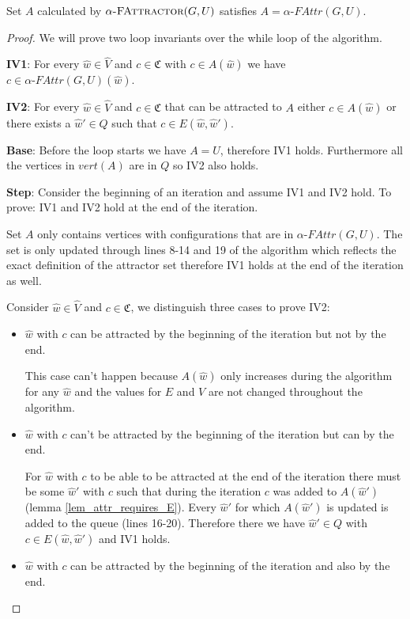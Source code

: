 \begin{theorem}
Set $A$ calculated by $\textsc{$\alpha$-FAttractor}(G,U)$ satisfies $A = \alpha\textit{-FAttr}(G,U)$.
	\begin{proof} We will prove two loop invariants over the while loop of the algorithm.
		
		\textbf{IV1}: For every $\hat{w} \in \hat{V}$ and $c \in \mathfrak{C}$ with $c \in A(\hat{w})$ we have $c \in \alpha\textit{-FAttr}(G,U)(\hat{w})$.
		
		\textbf{IV2}: For every $\hat{w} \in \hat{V}$ and $c \in \mathfrak{C}$ that can be attracted to $A$ either $c \in A(\hat{w})$ or there exists a $\hat{w}' \in Q$ such that $c \in E(\hat{w},\hat{w}')$.
		
		\textbf{Base}: Before the loop starts we have $A = U$, therefore IV1 holds. Furthermore all the vertices in $vert(A)$ are in $Q$ so IV2 also holds.
		
		\textbf{Step}: Consider the beginning of an iteration and assume IV1 and IV2 hold. To prove: IV1 and IV2 hold at the end of the iteration.
		
		Set $A$ only contains vertices with configurations that are in $\alpha\textit{-FAttr}(G,U)$. The set is only updated through lines 8-14 and 19 of the algorithm which reflects the exact definition of the attractor set therefore IV1 holds at the end of the iteration as well.
		
		Consider $\hat{w} \in \hat{V}$ and $c \in \mathfrak{C}$, we distinguish three cases to prove IV2:
		\begin{itemize}
			\item $\hat{w}$ with $c$ can be attracted by the beginning of the iteration but not by the end.
			
			This case can't happen because $A(\hat{w})$ only increases during the algorithm for any $\hat{w}$ and the values for $E$ and $V$ are not changed throughout the algorithm.
			\item $\hat{w}$ with $c$ can't be attracted by the beginning of the iteration but can by the end.
			
			For $\hat{w}$ with $c$ to be able to be attracted at the end of the iteration there must be some $\hat{w}'$ with $c$ such that during the iteration $c$ was added to $A(\hat{w}')$ (lemma \ref{lem_attr_requires_E}). Every $\hat{w}'$ for which $A(\hat{w}')$ is updated is added to the queue (lines 16-20). Therefore there we have $\hat{w}' \in Q$ with $c \in E(\hat{w},\hat{w}')$ and IV1 holds.
			\item $\hat{w}$ with $c$ can be attracted by the beginning of the iteration and also by the end.
			

\end{itemize}
\end{proof}
\end{theorem}
